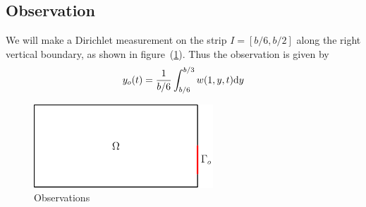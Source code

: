 \documentclass[12pt]{article}
\begin{document}
\subsection{Observation}
We will make a Dirichlet measurement on the strip $I = [b/6,b/2]$ along the right vertical boundary, as shown in figure~(\ref{fig:obs}). Thus the observation is given by
\begin{equation*}
y_o(t) = \frac{1}{b/6} \int_{b/6}^{b/3} w(1,y,t) \textrm{d} y
\end{equation*}

\begin{figure}[h]
\begin{center}
\includegraphics[width=0.6\textwidth]{burger2d_obs}
\caption{Observations}
\label{fig:obs}
\end{center}
\end{figure}

\end{document}
